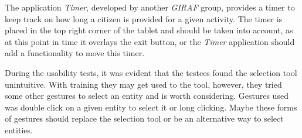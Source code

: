 \begin{description}[style=nextline]
\item[Placement of timer]
The application \textit{Timer}, developed by another \textit{GIRAF} group, provides a timer to keep track on how long a citizen is provided for a given activity. 
The timer is placed in the top right corner of the tablet and should be taken into account, as at this point in time it overlays the exit button, or the \textit{Timer} application should add a functionality to move this timer.

\item[Reconsider selection of entities]
During the usability tests, it was evident that the testees found the selection tool unintuitive.
With training they may get used to the tool, however, they tried some other gestures to select an entity and is worth considering.
Gestures used was double click on a given entity to select it or long clicking.
Maybe these forms of gestures should replace the selection tool or be an alternative way to select entities.


\end{description}